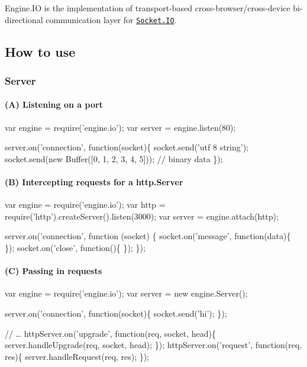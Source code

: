 \href{http://travis-ci.org/socketio/engine.io}{\tt } \href{http://badge.fury.io/js/engine.io}{\tt }

{\ttfamily Engine.\+IO} is the implementation of transport-\/based cross-\/browser/cross-\/device bi-\/directional communication layer for \href{http://github.com/socketio/socket.io}{\tt Socket.\+IO}.

\subsection*{How to use}

\subsubsection*{Server}

\paragraph*{(A) Listening on a port}


\begin{DoxyCode}
var engine = require('engine.io');
var server = engine.listen(80);

server.on('connection', function(socket)\{
  socket.send('utf 8 string');
  socket.send(new Buffer([0, 1, 2, 3, 4, 5])); // binary data
\});
\end{DoxyCode}


\paragraph*{(B) Intercepting requests for a http.\+Server}


\begin{DoxyCode}
var engine = require('engine.io');
var http = require('http').createServer().listen(3000);
var server = engine.attach(http);

server.on('connection', function (socket) \{
  socket.on('message', function(data)\{ \});
  socket.on('close', function()\{ \});
\});
\end{DoxyCode}


\paragraph*{(C) Passing in requests}


\begin{DoxyCode}
var engine = require('engine.io');
var server = new engine.Server();

server.on('connection', function(socket)\{
  socket.send('hi');
\});

// …
httpServer.on('upgrade', function(req, socket, head)\{
  server.handleUpgrade(req, socket, head);
\});
httpServer.on('request', function(req, res)\{
  server.handleRequest(req, res);
\});
\end{DoxyCode}


